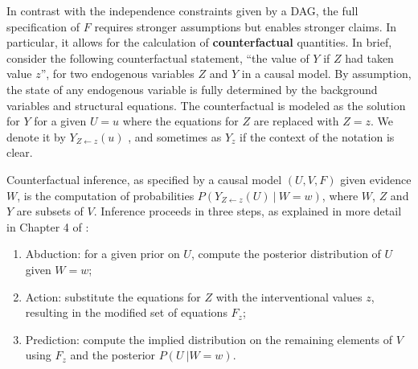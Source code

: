 In contrast with the independence constraints given by a DAG, the full
specification of $F$ requires stronger assumptions but enables
stronger claims. In particular, it allows for the
calculation of {\bf counterfactual} quantities. %
In brief, consider the following counterfactual
statement, ``the value of $Y$ if $Z$ had taken value $z$'', for two endogenous
variables $Z$ and $Y$ in a causal model. By assumption, the state of
any endogenous variable is fully determined by
the background variables and structural equations. The counterfactual is
modeled as the solution for $Y$ for a given $U = u$ where the equations
for $Z$ are replaced with $Z \!=\! z$.  We denote it by $Y_{Z \leftarrow z}(u)$
\cite{pearl:00}, and sometimes as $Y_z$ if the context of the notation is clear.

Counterfactual inference, as specified by a causal model $(U, V, F)$ given evidence $W$,
is the computation of probabilities
$P(Y_{Z \leftarrow z}(U)\ |\ W \!=\! w)$, where $W$, $Z$ and $Y$ are
subsets of $V$. Inference proceeds in three steps, as explained in
more detail in Chapter 4 of \citet{pearl:16}:
\begin{enumerate}
\item Abduction: for a given prior on $U$, compute the posterior
  distribution of $U$ given %
  $W = w$;
\item Action: substitute the equations for $Z$ with the interventional
  values $z$, resulting in the modified set of equations $F_z$;
\item Prediction: compute the implied distribution on the remaining
  elements of $V$ using $F_z$ and the posterior $P(U\ | W = w)$.
\end{enumerate}



